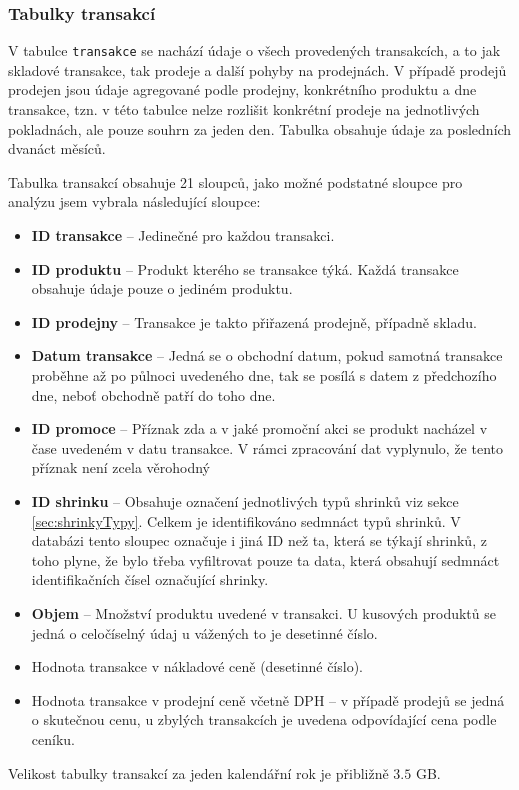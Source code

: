 \subsubsection{Tabulky transakcí}
V tabulce \texttt{transakce} se nachází údaje o všech provedených transakcích, a to jak skladové transakce, tak prodeje a další pohyby na prodejnách. V případě prodejů prodejen jsou údaje agregované podle prodejny, konkrétního produktu a dne transakce, tzn. v této tabulce nelze rozlišit konkrétní prodeje na jednotlivých pokladnách, ale pouze souhrn za jeden den. Tabulka obsahuje údaje za posledních dvanáct měsíců.

Tabulka transakcí obsahuje 21 sloupců, jako možné podstatné sloupce pro analýzu jsem vybrala následující sloupce:

\begin{itemize}
    \itemsep0em
    \item \textbf{ID transakce} -- Jedinečné pro každou transakci.
    \item \textbf{ID produktu} -- Produkt kterého se transakce týká. Každá transakce obsahuje údaje pouze o jediném produktu. 
    \item \textbf{ID prodejny} -- Transakce je takto přiřazená prodejně, případně skladu. %
    \item \textbf{Datum transakce} -- Jedná se o obchodní datum, pokud samotná transakce proběhne až po půlnoci uvedeného dne, tak se posílá s datem z předchozího dne, neboť obchodně patří do toho dne.
    \item \textbf{ID promoce} -- Příznak zda a v jaké promoční akci se produkt nacházel v čase uvedeném v datu transakce. V rámci zpracování dat vyplynulo, že tento příznak není zcela věrohodný 
    \item \textbf{ID shrinku} -- Obsahuje označení jednotlivých typů shrinků viz sekce \ref*{sec:shrinkyTypy}. Celkem je identifikováno sedmnáct typů shrinků. V databázi tento sloupec označuje i jiná ID než ta, která se týkají shrinků, z toho plyne, že bylo třeba vyfiltrovat pouze ta data, která obsahují sedmnáct identifikačních čísel označující shrinky. %
    \item \textbf{Objem} -- Množství produktu uvedené v transakci. U kusových produktů se jedná o celočíselný údaj u vážených to je desetinné číslo.
    \item Hodnota transakce v nákladové ceně (desetinné číslo).
    \item Hodnota transakce v prodejní ceně včetně DPH -- v případě prodejů se jedná o skutečnou cenu, u zbylých transakcích je uvedena odpovídající cena podle ceníku.
\end{itemize}
Velikost tabulky transakcí za jeden kalendářní rok je přibližně $3.5$ GB. 

